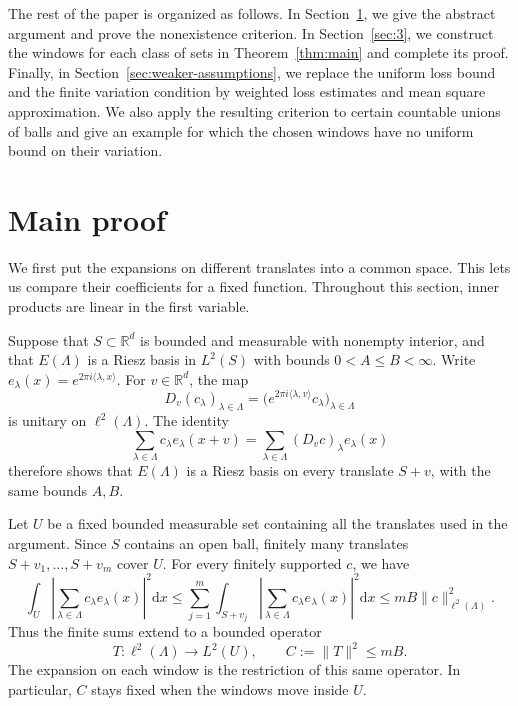 \documentclass[10pt,a4paper]{amsart}
\def\R{\mathbb{R}}
\def\d{\mathrm{d}}
\newcommand\norm[1]{\|#1\|}
\newcommand\inpro[2]{\langle #1,#2\rangle}
\newcommand\1{\mathbbm{1}}
\def\d{\mathrm{d}}
\begin{document}
The rest of the paper is organized as follows.
In Section~\ref{sec:main-proof}, we give the abstract argument and prove the
nonexistence criterion.
In Section~\ref{sec:3}, we construct the windows for each class of sets in
Theorem~\ref{thm:main} and complete its proof.
Finally, in Section~\ref{sec:weaker-assumptions}, we replace the uniform
loss bound and the finite variation condition by weighted loss estimates and
mean square approximation. We also apply the resulting criterion to certain
countable unions of balls and give an example for which the chosen windows
have no uniform bound on their variation.

\section{Main proof}\label{sec:main-proof}

We first put the expansions on different translates into a common space.
This lets us compare their coefficients for a fixed function. Throughout this section, inner products are linear in the
first variable.

Suppose that $S\subset\R^d$ is bounded and measurable with nonempty interior, and that
$E(\Lambda)$ is a Riesz basis in $L^2(S)$ with bounds $0<A\le B<\infty$.
Write $e_\lambda(x)=e^{2\pi i\inpro{\lambda}{x}}$.
For $v\in\R^d$, the map
\begin{equation*}
    D_v(c_\lambda)_{\lambda\in\Lambda}
    =\bigl(e^{2\pi i\inpro{\lambda}{v}}c_\lambda\bigr)_{\lambda\in\Lambda}
\end{equation*}
is unitary on $\ell^2(\Lambda)$. The identity
\begin{equation*}
    \sum_{\lambda\in\Lambda}c_\lambda e_\lambda(x+v)
    =\sum_{\lambda\in\Lambda}(D_vc)_\lambda e_\lambda(x)
\end{equation*}
therefore shows that $E(\Lambda)$ is a Riesz basis on every translate $S+v$,
with the same bounds $A,B$.

Let $U$ be a fixed bounded measurable set containing all the translates used
in the argument. Since $S$ contains an open ball, finitely many translates
$S+v_1,\ldots,S+v_m$ cover $U$. For every finitely supported $c$, we have
\begin{equation*}
    \int_U\left|\sum_{\lambda\in\Lambda}c_\lambda e_\lambda(x)\right|^2\d x
    \le\sum_{j=1}^{m}\int_{S+v_j}
       \left|\sum_{\lambda\in\Lambda}c_\lambda e_\lambda(x)\right|^2\d x
    \le mB\norm{c}_{\ell^2(\Lambda)}^2.
\end{equation*}
Thus the finite sums extend to a bounded operator
\begin{equation}\label{eq:main-synthesis}
    T:\ell^2(\Lambda)\longrightarrow L^2(U),
    \qquad C:=\norm{T}^2\le mB.
\end{equation}
The expansion on each window is the restriction of this same operator.
In particular, $C$ stays fixed when the windows move inside $U$.
\end{document}
